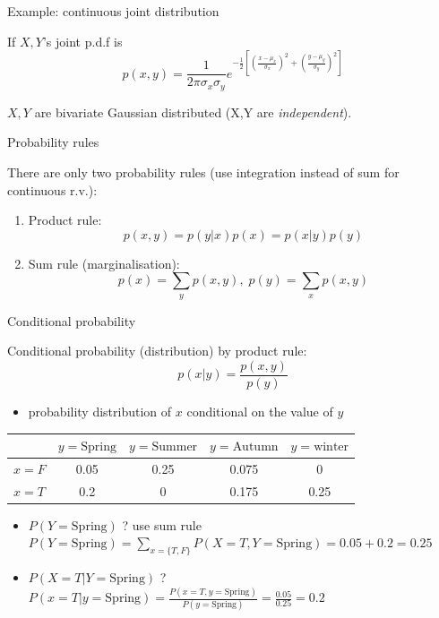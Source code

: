 \documentclass[ignorenonframetext,]{beamer}
\providecommand{\tightlist}{%
  \setlength{\itemsep}{0pt}\setlength{\parskip}{0pt}}
\begin{document}
\begin{frame}{Example: continuous joint distribution}
\protect\hypertarget{example-continuous-joint-distribution}{}

If \(X,Y\)'s joint p.d.f is
\[p(x,y) = \frac{1}{2\pi\sigma_x\sigma_y} e^{-\frac{1}{2}[(\frac{x-\mu_x}{\sigma_x})^2 +(\frac{y-\mu_y}{\sigma_y})^2] }\]

\(X,Y\) are bivariate Gaussian distributed (X,Y are \emph{independent}).

\end{frame}

\begin{frame}{Probability rules}
\protect\hypertarget{probability-rules}{}

There are only two probability rules (use integration instead of sum for
continuous r.v.):

\begin{enumerate}
    \item Product rule: \[ p(x, y) = p (y|x)p(x) = p(x|y)p(y)\]
    \item Sum rule (marginalisation): \[ p (x) = \sum_y p(x, y),\; p(y) = \sum_x p(x, y)\]
\end{enumerate}

\end{frame}

\begin{frame}{Conditional probability}
\protect\hypertarget{conditional-probability}{}

Conditional probability (distribution) by product rule:
\[p (x| y) = \frac{p(x, y)}{p(y)}\]

\begin{itemize}
\tightlist
\item
  probability distribution of \(x\) conditional on the value of \(y\)
\end{itemize}

\bigskip

\begin{table}\centering
\begin{tabular}{ l | c | c | c | c}
   \centering                    
   & $y=\text{Spring}$ & $y=\text{Summer}$ &$y=\text{Autumn}$ & $y=\text{winter}$\\ 
   \hline
  $x= F$ & 0.05 & 0.25 & 0.075& 0\\
    \hline 
  $x= T$ & 0.2 & 0 & 0.175& 0.25\\ 
\end{tabular}
\end{table}

\bigskip

\begin{itemize}
\item
  \(P(Y= \text{Spring})\) ? use sum rule
  \(P(Y = \text{Spring}) = \sum_{x=\{T,F\}} P(X=T,Y=\text{Spring}) =0.05+0.2=0.25\)
\item
  \(P(X=T | Y= \text{Spring})\) ?
  \(P(x=T | y = \text{Spring}) = \frac{P(x=T, y=\text{Spring})}{P(y=\text{Spring})}=\frac{0.05}{0.25}=0.2\)
\end{itemize}

\end{frame}
\end{document}
